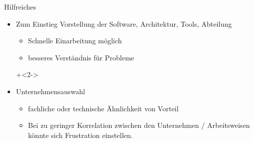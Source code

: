 \begin{frame}{Hilfreiches}

\begin{itemize}

\item Zum Einstieg Vorstellung der Software, Architektur, Tools, Abteilung
\begin{itemize}
\item Schnelle Einarbeitung möglich
\item besseres Verständnis für Probleme
\end{itemize}

\onslide+<2->
\item Unternehmensauswahl
\begin{itemize}
\item fachliche oder technische Ähnlichkeit von Vorteil
\item Bei zu geringer Korrelation zwischen den Unternehmen / Arbeitsweisen könnte sich Frustration einstellen.
\end{itemize}

\end{itemize}

\end{frame}

